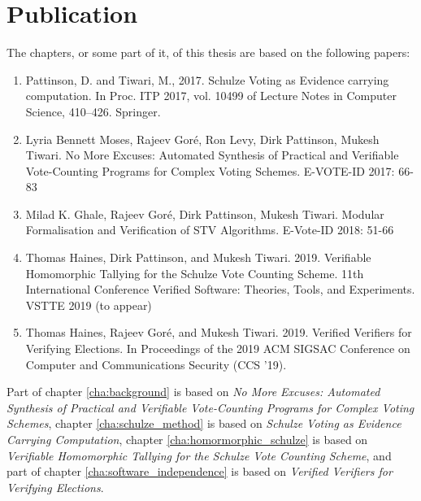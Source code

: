 \section{Publication}
 The chapters, or some part of it,  of this thesis are based on the following papers:
	\begin{enumerate}
	\item Pattinson, D. and Tiwari, M., 2017. Schulze Voting as Evidence carrying computation. In Proc. 
	ITP 2017, vol. 10499 of Lecture Notes in Computer Science, 410–426. Springer. 
	\item Lyria Bennett Moses, Rajeev Goré, Ron Levy, Dirk Pattinson, Mukesh Tiwari.
	No More Excuses: Automated Synthesis of Practical and Verifiable Vote-Counting Programs for Complex 
	Voting 	Schemes. E-VOTE-ID 2017: 66-83
	\item Milad K. Ghale, Rajeev Goré, Dirk Pattinson, Mukesh Tiwari.
	Modular Formalisation and Verification of STV Algorithms. E-Vote-ID 2018: 51-66
	\item Thomas Haines, Dirk Pattinson, and Mukesh Tiwari. 2019. 
	  Verifiable Homomorphic Tallying for the Schulze Vote Counting Scheme. 
	  11th International Conference Verified Software: Theories, Tools, and Experiments. 
      VSTTE 2019 (to appear)	  
	\item Thomas Haines, Rajeev Goré, and Mukesh Tiwari. 2019. Verified Verifiers for Verifying Elections. 
	 In Proceedings of the 2019 ACM SIGSAC Conference on Computer and Communications Security (CCS '19).
	\end{enumerate}
 \noindent
 Part of chapter \ref{cha:background} is based on \textit{No More Excuses: Automated Synthesis of Practical 
 and Verifiable Vote-Counting Programs for Complex Voting  Schemes},
 chapter \ref{cha:schulze_method} is based on \textit{Schulze Voting as Evidence Carrying Computation},
 chapter \ref{cha:homormorphic_schulze} is based on \textit{Verifiable Homomorphic Tallying for the 
 Schulze Vote Counting Scheme}, and part of chapter
 \ref{cha:software_independence} is based on \textit{Verified Verifiers for Verifying Elections}.





